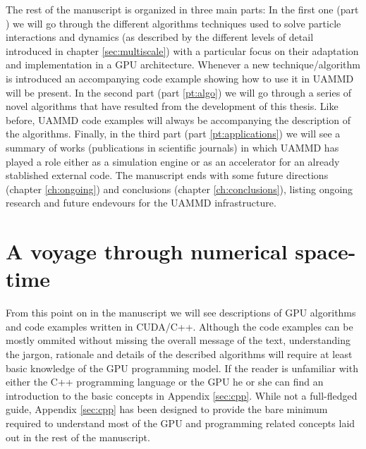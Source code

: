 \documentclass[ twoside,openright,titlepage,numbers=noenddot,%
headinclude,footinclude,cleardoublepage=empty,abstract=on,
BCOR=5mm,paper=a4,fontsize=11pt, dvipsnames
]{scrreprt}
\newcommand{\uammd}{\gls{UAMMD}\xspace}
\newcommand{\gpu}{\gls{GPU}\xspace}
\begin{document}
The rest of the manuscript is organized in three main parts: In the first one (part \ref{part:voyage}) we will go through the different algorithms techniques used to solve particle interactions and dynamics (as described by the different levels of detail introduced in chapter \ref{sec:multiscale}) with a particular focus on their adaptation and implementation in a \gpu architecture. Whenever a new technique/algorithm is introduced an accompanying code example showing how to use it in \uammd will be present. In the second part (part \ref{pt:algo}) we will go through a series of novel algorithms that have resulted from the development of this thesis. Like before, \uammd code examples will always be accompanying the description of the algorithms. Finally, in the third part (part \ref{pt:applications}) we will see a summary of works (publications in scientific journals) in which \uammd has played a role either as a simulation engine or as an accelerator for an already stablished external code. The manuscript ends with some future directions (chapter \ref{ch:ongoing}) and conclusions (chapter \ref{ch:conclusions}), listing ongoing research and future endevours for the \uammd infrastructure.



\newpage

\cleardoublepage

\part{A voyage through numerical space-time}\label{part:voyage}


From this point on in the manuscript we will see descriptions of GPU algorithms and code examples written in CUDA/C++. Although the code examples can be mostly ommited without missing the overall message of the text, understanding the jargon, rationale and details of the described algorithms will require at least basic knowledge of the GPU programming model. If the reader is unfamiliar with either the C++ programming language or the GPU he or she can find an introduction to the basic concepts in Appendix \ref{sec:cpp}. While not a full-fledged guide, Appendix \ref{sec:cpp} has been designed to provide the bare minimum required to understand most of the GPU and programming related concepts laid out in the rest of the manuscript.
\end{document}
